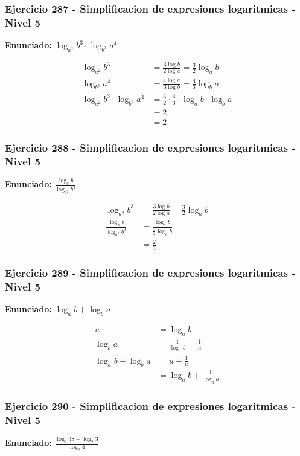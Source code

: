 \documentclass[12pt,a4paper]{article}
\begin{document}
\subsubsection*{Ejercicio 287 - Simplificacion de expresiones logaritmicas - Nivel 5}
\textbf{Enunciado:} \(\log_{a^2}b^3\cdot\log_{b^3}a^4\)

\[
\begin{aligned}
\log_{a^2}b^3&=\frac{3\log b}{2\log a}=\frac32\log_a b\\
\log_{b^3}a^4&=\frac{4\log a}{3\log b}=\frac43\log_b a\\
\log_{a^2}b^3\cdot\log_{b^3}a^4&=\frac32\cdot\frac43\cdot\log_a b\cdot\log_b a\\
&=2\\
&=\boxed{2}
\end{aligned}
\]


\subsubsection*{Ejercicio 288 - Simplificacion de expresiones logaritmicas - Nivel 5}
\textbf{Enunciado:} \(\frac{\log_a b}{\log_{a^2}b^3}\)

\[
\begin{aligned}
\log_{a^2}b^3&=\frac{3\log b}{2\log a}=\frac32\log_a b\\
\frac{\log_a b}{\log_{a^2}b^3}&=\frac{\log_a b}{\frac32\log_a b}\\
&=\boxed{\frac23}
\end{aligned}
\]


\subsubsection*{Ejercicio 289 - Simplificacion de expresiones logaritmicas - Nivel 5}
\textbf{Enunciado:} \(\log_a b+\log_b a\)

\[
\begin{aligned}
u&=\log_a b\\
\log_b a&=\frac1{\log_a b}=\frac1u\\
\log_a b+\log_b a&=u+\frac1u\\
&=\boxed{\log_a b+\frac1{\log_a b}}
\end{aligned}
\]


\subsubsection*{Ejercicio 290 - Simplificacion de expresiones logaritmicas - Nivel 5}
\textbf{Enunciado:} \(\frac{\log_2 48-\log_2 3}{\log_2 4}\)
\end{document}
